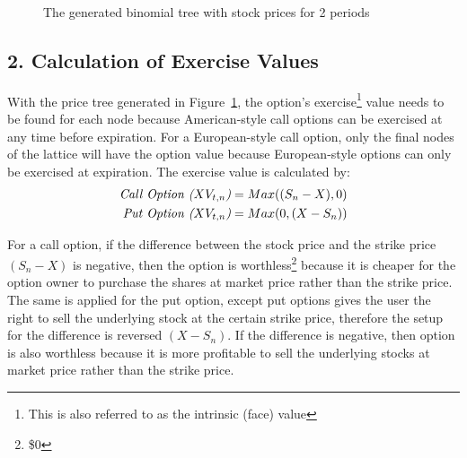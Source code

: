 \documentclass[12pt, letterpaper]{article}\usepackage{float}
\begin{document}
\begin{figure}[H]
  \caption{The generated binomial tree with stock prices for 2 periods}
  \label{fig:lattice_with_stock_prices}
\end{figure}


\pagebreak
\subsection*{2. Calculation of Exercise Values}
With the price tree generated in Figure~\ref{fig:lattice_with_stock_prices}, the option's exercise\footnote{This is also referred to as the intrinsic (face) value} value needs to be found for each node because American-style call options can be exercised at any time before expiration.
For a European-style call option, only the final nodes of the lattice will have the option value because European-style options can only be exercised at expiration. 
The exercise value is calculated \cite{bopmwikipedia} by:
\begin{align*}
  \text{\textit{Call Option (${XV_{t,n}}$)}} &= Max({(S_n - X)}, 0) \\
  \text{\textit{Put Option (${XV_{t,n}}$)}} &= Max(0, {(X - S_n)}) 
\end{align*}

\bigskip

For a call option, if the difference between the stock price and the strike price ${(S_n - X)}$ is negative, then the option is worthless\footnote{\$0} because it is cheaper for the option owner to purchase the shares at market price rather than the strike price.
The same is applied for the put option, except put options gives the user the right to sell the underlying stock at the certain strike price, therefore the setup for the difference is reversed ${(X - S_n)}$.
If the difference is negative, then option is also worthless because it is more profitable to sell the underlying stocks at market price rather than the strike price.
\end{document}
